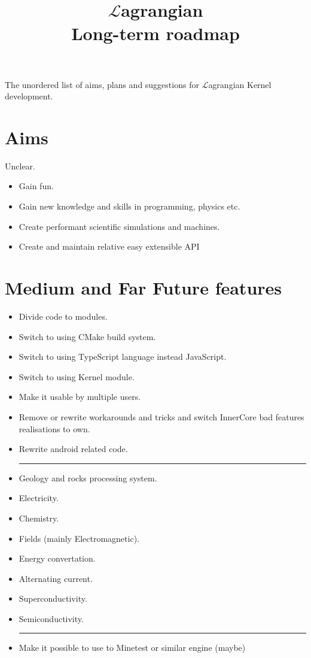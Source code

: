 \documentclass[12pt]{article}
\title{$\mathcal{L}$agrangian \\ Long-term roadmap}
\begin{document}
	\maketitle

	The unordered list of aims, plans and suggestions for $\mathcal{L}$agrangian Kernel development.

	\section{Aims}
	Unclear.
	\begin{itemize}
		\item Gain fun.
		\item Gain new knowledge and skills in programming, physics etc.
		\item Create performant scientific simulations and machines.
		\item Create and maintain relative easy extensible API
	\end{itemize}

	\section{Medium and Far Future features}

	\begin{itemize}
		\item Divide code to modules.
		\item Switch to using CMake build system.
		\item Switch to using TypeScript language instead JavaScript.
		\item Switch to using Kernel module.
		\item Make it usable by multiple users. 
		\item Remove or rewrite workarounds and tricks and switch InnerCore bad features realisations to own.
		\item Rewrite android related code. \\
		\noindent\rule{\textwidth}{0.4pt}
		\item Geology and rocks processing system.
		\item Electricity.
		\item Chemistry.
		\item Fields (mainly Electromagnetic).
		\item Energy convertation.
		\item Alternating current.
		\item Superconductivity.
		\item Semiconductivity. \\
		\noindent\rule{\textwidth}{0.4pt}
		\item Make it possible to use to Minetest or similar engine (maybe)
	\end{itemize}
\end{document}
